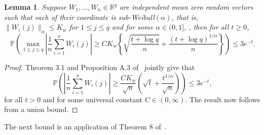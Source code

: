 \documentclass[11pt]{article}
\newtheorem{lemma}[theorem]{Lemma}
\begin{document}
\begin{appendices}
\begin{lemma}\label{lemma:Thm3.1.KuchAbhi}
Suppose $W_1, \ldots, W_n\in\mathbb{R}^q$ are independent mean zero random vectors such that each of their coordinate is sub-Weibull$(\alpha)$, that is, $\|W_i(j)\|_{\alpha} \le K_w$ for $1\le j\le q$ and for 
some $\alpha\in (0, 1]$, , then for all $t\ge0$,
\[
\mathbb{P}\left(\max_{1\le j\le q}\left|\frac{1}{n}\sum_{i=1}^n W_i(j)\right| \ge CK_w\left\{\sqrt{\frac{t + \log q}{n}} + \frac{(t + \log q)^{1/\alpha}}{n}\right\}\right) \le 3e^{-t}.
\]
\end{lemma}
\begin{proof}
Theorem 3.1 and Proposition A.3 of~\cite{KuchAbhi17} jointly give that
\[
\mathbb{P}\left(\left|\frac{1}{n}\sum_{i=1}^n W_i(j)\right| \ge \frac{CK_w}{\sqrt{n}}\left(\sqrt{t} + \frac{t^{1/\alpha}}{\sqrt{n}}\right)\right) \le 3e^{-t},
\]
for all $t > 0$ and for some universal constant $C\in(0, \infty)$. The result now follows from a union bound. 
\end{proof}

The next bound is an application of Theorem 8 of~\cite{Bouch05}.


\end{appendices}
\end{document}
